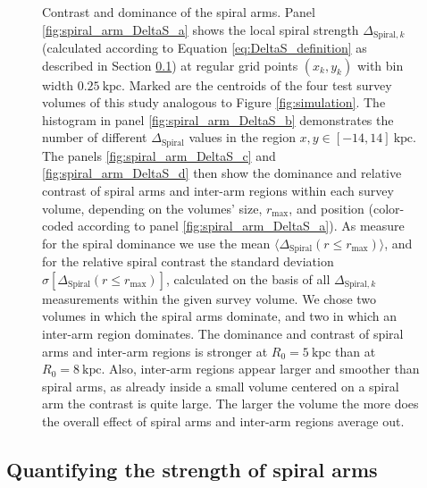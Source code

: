 \documentclass[iop,revtex4,numberedappendix,appendixfloats]{emulateapj}
\newcommand{\hiddenComment}[1]{}
\begin{document}
\begin{figure}[!htbp]
\caption{Contrast and dominance of the spiral arms. Panel \ref{fig:spiral_arm_DeltaS_a} shows the local spiral strength $\Delta_{\text{Spiral},k}$ (calculated according to Equation \eqref{eq:DeltaS_definition} as described in Section \ref{sec:spiral_arm_DeltaS}) at regular grid points $(x_k,y_k)$ with bin width $0.25~\text{kpc}$. Marked are the centroids of the four test survey volumes of this study analogous to Figure \ref{fig:simulation}. The histogram in panel \ref{fig:spiral_arm_DeltaS_b} demonstrates the number of different $\Delta_\text{Spiral}$ values in the region $x,y \in [-14,14]~\text{kpc}$. The panels \ref{fig:spiral_arm_DeltaS_c} and \ref{fig:spiral_arm_DeltaS_d} then show the dominance and relative  contrast of spiral arms and inter-arm regions within each survey volume, depending on the volumes' size, $r_\text{max}$, and position (color-coded according to panel \ref{fig:spiral_arm_DeltaS_a}). As measure for the spiral dominance we use the mean $\langle \Delta_\text{Spiral} (r \leq r_\text{max}) \rangle$, and for the relative spiral contrast the standard deviation $\sigma[\Delta_\text{Spiral} (r \leq r_\text{max})]$, calculated on the basis of all $\Delta_{\text{Spiral},k}$ measurements within the given survey volume. We chose two volumes in which the spiral arms dominate, and two in which an inter-arm region dominates. The dominance and contrast of spiral arms and inter-arm regions is stronger at $R_0=5~\text{kpc}$ than at $R_0=8~\text{kpc}$. Also, inter-arm regions appear larger and smoother than spiral arms, as already inside a small volume centered on a spiral arm the contrast is quite large. The larger the volume the more does the overall effect of spiral arms and inter-arm regions average out.  \hiddenComment{[TO DO: Jo suggested to look into implementing a $\text{sech}^2$ disk for galpy to not have the slight bias in mean($\kappa$) at higher rmax. Maybe it's easy to implement. Maybe it isn't. Reference for sech(z) disk: \url{http://adsabs.harvard.edu/abs/1989MNRAS.239..571K}]}}
\label{fig:spiral_arm_DeltaS}
\end{figure}


\subsection{Quantifying the strength of spiral arms} \label{sec:spiral_arm_DeltaS}
\end{document}
